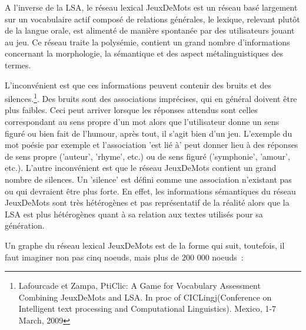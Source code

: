 \documentclass[a4paper,11pt,french]{article}
\begin{document}
A l'inverse de la LSA, le réseau lexical JeuxDeMots est un réseau basé largement sur un vocabulaire actif composé de relations générales, le lexique, relevant plutôt de la langue orale, est alimenté de manière spontanée par des utilisateurs jouant au jeu. Ce réseau traite la polysémie, contient un grand nombre d'informations concernant la morphologie, la sémantique et des aspect métalinguistiques des termes.

L'inconvénient est que ces informations peuvent contenir des bruits et des silences.\footnote{Lafourcade et Zampa, PtiClic: A Game for Vocabulary Assessment Combining JeuxDeMots and LSA. In proc of CICLingj(Conference on Intelligent text processing and Computational Linguistics). Mexico, 1-7 March, 2009}. Des bruits sont des associations imprécises, qui en général doivent être plus faibles. Ceci peut arriver lorsque les réponses attendus sont celles correspondant au sens propre d'un mot alors que l'utilisateur donne un sens figuré ou bien fait de l'humour, après tout, il s'agit bien d'un jeu. L'exemple du mot poésie par exemple et l'association 'est lié à' peut donner lieu à des réponses de sens propre ('auteur', 'rhyme', etc.) ou de sens figuré ('symphonie', 'amour', etc.). L'autre inconvénient est que le réseau JeuxDeMots contient un grand nombre de silences. Un 'silence' est défini comme une association n'existant pas ou qui devraient être plus forte. En effet, les informations sémantiques du réseau JeuxDeMots sont très hétérogènes et pas représentatif de la réalité alors que la LSA est plus hétérogènes quant à sa relation aux textes utilisés pour sa génération.

Un graphe du réseau lexical JeuxDeMots est de la forme qui suit, toutefois, il faut imaginer non pas cinq noeuds, mais plus de 200 000 noeuds~:
\end{document}
